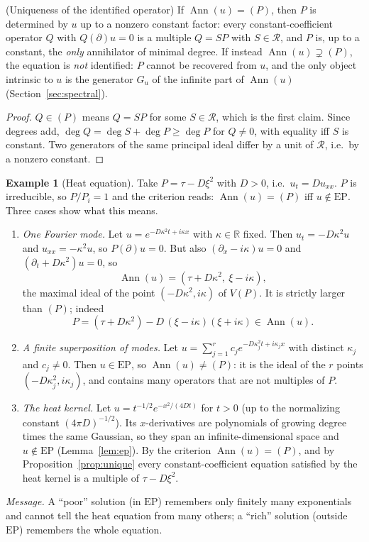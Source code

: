 \documentclass[11pt,a4paper]{article}
\theoremstyle{definition}
\newtheorem{example}{Example}[section]
\newcommand{\R}{\mathbb{R}}\newcommand{\C}{\mathbb{C}}\newcommand{\N}{\mathbb{N}}\newcommand{\Z}{\mathbb{Z}}
\newcommand{\Ann}{\operatorname{Ann}}
\newcommand{\EP}{\mathrm{EP}}
\newcommand{\ring}{\mathcal{R}}
\newcommand{\Var}{V}
\begin{document}
\begin{proposition}{(Uniqueness of the identified operator)}\label{prop:unique}
If $\Ann(u)=(P)$, then $P$ is determined by $u$ up to a nonzero constant factor: every constant-coefficient operator $Q$ with $Q(\partial)u=0$ is a multiple $Q=SP$ with $S\in\ring$, and $P$ is, up to a constant, the \emph{only} annihilator of minimal degree. If instead $\Ann(u)\supsetneq(P)$, the equation is \emph{not} identified: $P$ cannot be recovered from $u$, and the only object intrinsic to $u$ is the generator $G_u$ of the infinite part of $\Ann(u)$ (Section~\ref{sec:spectral}).
\end{proposition}
\begin{proof}
$Q\in(P)$ means $Q=SP$ for some $S\in\ring$, which is the first claim. Since degrees add, $\deg Q=\deg S+\deg P\ge\deg P$ for $Q\ne0$, with equality iff $S$ is constant. Two generators of the same principal ideal differ by a unit of $\ring$, i.e.\ by a nonzero constant.
\end{proof}

\begin{example}[Heat equation]\label{ex:heat}
Take $P=\tau-D\xi^2$ with $D>0$, i.e.\ $u_t=Du_{xx}$. $P$ is irreducible, so $P/P_i=1$ and the criterion reads: $\Ann(u)=(P)$ iff $u\notin\EP$. Three cases show what this means.
\begin{enumerate}[label=(\roman*),nosep]
\item \emph{One Fourier mode.} Let $u=e^{-D\kappa^2t+i\kappa x}$ with $\kappa\in\R$ fixed. Then $u_t=-D\kappa^2u$ and $u_{xx}=-\kappa^2u$, so $P(\partial)u=0$. But also $(\partial_x-i\kappa)u=0$ and $(\partial_t+D\kappa^2)u=0$, so
\[
\Ann(u)=(\tau+D\kappa^2,\ \xi-i\kappa),
\]
the maximal ideal of the point $(-D\kappa^2,i\kappa)$ of $\Var(P)$. It is strictly larger than $(P)$; indeed
\[
P=(\tau+D\kappa^2)-D\,(\xi-i\kappa)(\xi+i\kappa)\in\Ann(u).
\]
\item \emph{A finite superposition of modes.} Let $u=\sum_{j=1}^rc_je^{-D\kappa_j^2t+i\kappa_jx}$ with distinct $\kappa_j$ and $c_j\ne0$. Then $u\in\EP$, so $\Ann(u)\ne(P)$: it is the ideal of the $r$ points $(-D\kappa_j^2,i\kappa_j)$, and contains many operators that are not multiples of $P$.
\item \emph{The heat kernel.} Let $u=t^{-1/2}e^{-x^2/(4Dt)}$ for $t>0$ (up to the normalizing constant $(4\pi D)^{-1/2}$). Its $x$-derivatives are polynomials of growing degree times the same Gaussian, so they span an infinite-dimensional space and $u\notin\EP$ (Lemma~\ref{lem:ep}). By the criterion $\Ann(u)=(P)$, and by Proposition~\ref{prop:unique} every constant-coefficient equation satisfied by the heat kernel is a multiple of $\tau-D\xi^2$.
\end{enumerate}
\emph{Message.} A ``poor'' solution (in $\EP$) remembers only finitely many exponentials and cannot tell the heat equation from many others; a ``rich'' solution (outside $\EP$) remembers the whole equation.
\end{example}
\end{document}
